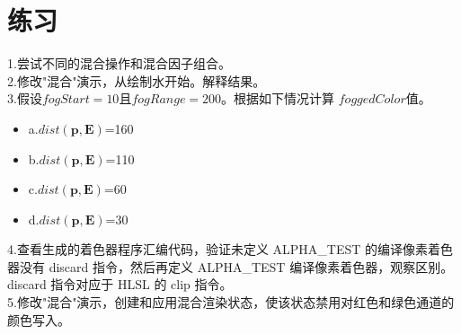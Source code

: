 \section{练习}
\begin{flushleft}
1.尝试不同的混合操作和混合因子组合。\\
2.修改"混合"演示，从绘制水开始。解释结果。\\
3.假设$fogStart=10$且$fogRange=200$。根据如下情况计算 $foggedColor$值。\\
\begin{itemize}
  \item a.$dist(\boldsymbol{p},\boldsymbol{E})$=160
  \item b.$dist(\boldsymbol{p},\boldsymbol{E})$=110
  \item c.$dist(\boldsymbol{p},\boldsymbol{E})$=60
  \item d.$dist(\boldsymbol{p},\boldsymbol{E})$=30
\end{itemize}
4.查看生成的着色器程序汇编代码，验证未定义 ALPHA\_TEST 的编译像素着色器没有 discard 指令，然后再定义 ALPHA\_TEST 编译像素着色器，观察区别。discard 指令对应于 HLSL 的 clip 指令。\\

5.修改"混合"演示，创建和应用混合渲染状态，使该状态禁用对红色和绿色通道的颜色写入。\\
\end{flushleft}


